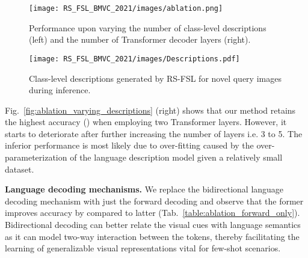 \documentclass{bmvc2k}
\begin{document}
\begin{figure}[!htp]
    \RawFloats
   \begin{minipage}{0.6\textwidth}
     \centering
     \texttt{[image: RS\_FSL\_BMVC\_2021/images/ablation.png]}
     \caption{Performance upon varying the number of class-level descriptions (left) and the number of Transformer decoder layers (right).}\label{fig:ablation_varying_descriptions}
   \end{minipage}\hfill
   \begin{minipage}{0.38\textwidth}
     \centering
     \texttt{[image: RS\_FSL\_BMVC\_2021/images/Descriptions.pdf]}
     \caption{Class-level descriptions generated by RS-FSL for novel query images during inference.}\label{fig:inference_descriptions}
   \end{minipage}
\end{figure}




\noindent Fig.~\ref{fig:ablation_varying_descriptions} (right) shows that our method retains the highest accuracy () when employing two Transformer layers. However, it starts to deteriorate after further increasing the number of layers i.e. 3 to 5. The inferior performance is most likely due to over-fitting caused by the over-parameterization of the language description model given a relatively small dataset.

\begin{SCtable}
\centering{}
\caption{Performance using only the forward decoding and the developed bidirectional decoding.}\label{table:ablation_forward_only}
\end{SCtable}
\noindent \textbf{Language decoding mechanisms.} 
We replace the bidirectional language decoding mechanism with just the forward decoding and observe that the former improves accuracy by  compared to latter (Tab.~\ref{table:ablation_forward_only}). Bidirectional decoding can better relate the visual cues with language semantics as it can model two-way interaction between the tokens, thereby facilitating the learning of generalizable visual representations vital for few-shot scenarios.
\end{document}
